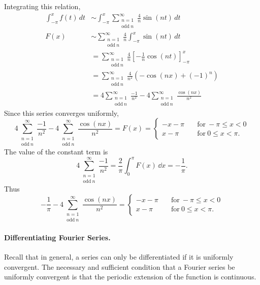 \begin{Example}
  Integrating this relation,
  \begin{align*}
    \int_{-\pi}^x f(t)\,d t
    &\sim \int_{-\pi}^x \sum_{\substack{ {n} = 1 \\ \mathrm{odd}\ n}}^{\infty} \frac{4}{n} \sin(n t)\,d t \\
    F(x)    &\sim \sum_{\substack{ {n} = 1 \\ \mathrm{odd}\ n}}^{\infty} \frac{4}{n} \int_{-\pi}^x \sin(n t)\,d t \\
    &= \sum_{\substack{ {n} = 1 \\ \mathrm{odd}\ n}}^{\infty} \frac{4}{n} \left[ -\frac{1}{n} \cos(n t) 
    \right]_{-\pi}^x \\
    &= \sum_{\substack{ {n} = 1 \\ \mathrm{odd}\ n}}^{\infty}\frac{4}{n^2}(-\cos(n x) + (-1)^n) \\
    &= 4\sum_{\substack{ {n} = 1 \\ \mathrm{odd}\ n}}^{\infty} \frac{-1}{n^2} - 4 \sum_{\substack{ {n} = 1 \\ \mathrm{odd}\ n}}^{\infty} \frac{\cos(n x)}
    {n^2}
  \end{align*}
  Since this series converges uniformly,
  \[ 4\sum_{\substack{ {n} = 1 \\ \mathrm{odd}\ n}}^{\infty} \frac{-1}{n^2} - 4 \sum_{\substack{ {n} = 1 \\ \mathrm{odd}\ n}}^{\infty} \frac{\cos(n x)}{n^2}
  = F(x)
  =       \begin{cases}
    -x - \pi \quad &\mathrm{for}\ -\pi \leq x < 0 \\
    x - \pi \quad &\mathrm{for}\ 0 \leq x < \pi.
  \end{cases}
  \]
  The value of the constant term is 
  \[ 4\sum_{\substack{ {n} = 1 \\ \mathrm{odd}\ n}}^{\infty} \frac{-1}{n^2} = \frac{2}{\pi} \int_0^\pi F(x)\,\dd x
  = -\frac{1}{\pi}.\]
  Thus
  \[-\frac{1}{\pi} - 4 \sum_{\substack{ {n} = 1 \\ \mathrm{odd}\ n}}^{\infty} \frac{\cos(n x)}{n^2}
  =       \begin{cases}
    -x - \pi \quad &\mathrm{for}\ -\pi \leq x < 0 \\
    x - \pi \quad &\mathrm{for}\ 0 \leq x < \pi.
  \end{cases}
  \]

\end{Example}



\paragraph{Differentiating Fourier Series.}
Recall that in general, a series can only be differentiated if it is 
uniformly convergent.  The necessary and sufficient condition that a Fourier
series be uniformly convergent is that the periodic extension of 
the function is continuous.



